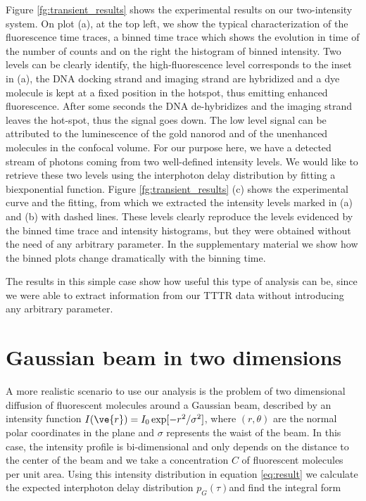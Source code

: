 Figure \ref{fg:transient_results} shows the experimental results on our two-intensity system. On plot (a), at the top left, we show the typical characterization of the fluorescence time traces, a binned time trace which shows the evolution in time of the number of counts and on the right the histogram of binned intensity. Two levels can be clearly identify, the high-fluorescence level corresponds to the inset in (a), the DNA docking strand and imaging strand are hybridized and a dye molecule is kept at a fixed position in the hotspot, thus emitting enhanced fluorescence. After some seconds the DNA de-hybridizes and the imaging strand leaves the hot-spot, thus the signal goes down. 
The low level signal can be attributed to the luminescence of the gold nanorod and of the unenhanced molecules in the confocal volume. 
For our purpose here, we have a detected stream of photons coming from two well-defined intensity levels. 
We would like to retrieve these two levels using the interphoton delay distribution by fitting a biexponential function. 
Figure \ref{fg:transient_results} (c) shows the experimental curve and the fitting, from which we extracted the intensity levels marked in (a) and (b) with dashed lines. These levels clearly reproduce the levels evidenced by the binned time trace and intensity histograms, but they were obtained without the need of any arbitrary parameter. In the supplementary material we show how the binned plots change dramatically with the binning time. 


The results in this simple case show how useful this type of analysis can be, since we were able to extract information from our TTTR data without introducing any arbitrary parameter.


\section{Gaussian beam in two dimensions\label{sec:gaussian2d}}

A more realistic scenario to use our analysis is the problem of two dimensional diffusion of fluorescent molecules around a Gaussian beam, described by an intensity function $I(\ve{r}) = I_0 \exp[-r^2/\sigma^2]$, where $(r,\theta)$ are the normal polar coordinates in the plane and $\sigma$ represents the waist of the beam. 
In this case, the intensity profile is bi-dimensional and only depends on the distance to the center of the beam and we take a concentration $C$ of fluorescent molecules per unit area. Using this intensity distribution in equation \ref{eq:result} we calculate the expected interphoton delay distribution $p_G(\tau)$and find the integral form

